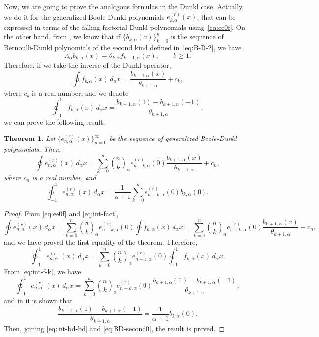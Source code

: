 \documentclass[11pt]{article}
\theoremstyle{plain}
\newtheorem{theorem}{Theorem}[section]
\theoremstyle{remark}
\numberwithin{equation}{section} %
\newcommand{\La}{\Lambda_{\alpha}}
\newcommand{\binoma}[2]{\binom{#1}{#2}_{\!\alpha}}
\begin{document}
Now, we are going to prove the analogous formulas in the Dunkl case. Actually, we do it for the generalized Boole-Dunkl polynomials $e_{k,\alpha}^{(r)}(x)$, that can be expressed in terms of the falling factorial Dunkl polynomials using~\eqref{eq:ee0f}.
On the other hand, from \cite[Theorem~6.2]{ELMV}, we know that if $\{b_{k,\alpha}(x)\}_{k=0}^n$ is the sequence of Bernoulli-Dunkl polynomials of the second kind defined in~\eqref{eq:B-D-2}, we have
\[
  \La b_{k,\alpha}(x) = \theta_{k,\alpha}f_{k-1,\alpha}(x), \qquad k \ge 1.
\]
Therefore, if we take the inverse of the Dunkl operator, 
\begin{equation}
\label{eq:int-fact}
  \oint f_{k,\alpha}(x)\,d_\alpha x = \frac{b_{k+1,\alpha}(x)}{\theta_{k+1,\alpha}} + c_k,
\end{equation}
where $c_k$ is a real number, and we denote
\begin{equation}
\label{eq:int-f-k}
  \oint_{-1}^1 f_{k,\alpha}(x)\,d_\alpha x 
  = \frac{b_{k+1,\alpha}(1)-b_{k+1,\alpha}(-1)}{\theta_{k+1,\alpha}},
\end{equation}
we can prove the following result:

\begin{theorem}
Let $\{e_{n,\alpha}^{(r)}(x)\}_{n=0}^{\infty}$ be the sequence of generalized Boole-Dunkl polynomials. Then,
\[
  \oint e_{n,\alpha}^{(r)}(x)\,d_{\alpha}x
  = \sum_{k=0}^n \binoma{n}{k} e_{n-k,\alpha}^{(r)}(0) \frac{b_{k+1,\alpha}(x)}{\theta_{k+1,\alpha}} + c_n,
\]
where $c_n$ is a real number, and
\[
  \oint_{-1}^1 e_{n,\alpha}^{(r)}(x)\,d_{\alpha}x
  = \frac{1}{\alpha+1} \sum_{k=0}^n e_{n-k,\alpha}^{(r)}(0)b_{k,\alpha}(0).
\]
\end{theorem}

\begin{proof}
From \eqref{eq:ee0f} and \eqref{eq:int-fact},
\[
  \oint e_{n,\alpha}^{(r)}(x)\,d_{\alpha}x
  = \sum_{k=0}^n \binoma{n}{k} e_{n-k,\alpha}^{(r)}(0)
  \oint f_{k,\alpha}(x)\,d_{\alpha}x
  = \sum_{k=0}^n \binoma{n}{k} e_{n-k,\alpha}^{(r)}(0) \frac{b_{k+1,\alpha}(x)}{\theta_{k+1,\alpha}} + c_n,
\]
and we have proved the first equality of the theorem. Therefore,
\[
  \oint_{-1}^1 e_{n,\alpha}^{(r)}(x)\,d_{\alpha}x
  = \sum_{k=0}^n \binoma{n}{k}e_{n-k,\alpha}^{(r)}(0) \oint_{-1}^1 f_{k,\alpha}(x)\,d_{\alpha}x.
\]
From \eqref{eq:int-f-k}, we have
\begin{equation}
\label{eq:int-bd-bd}
  \oint_{-1}^1 e_{n,\alpha}^{(r)}(x)\,d_{\alpha}x
  = \sum_{k=0}^n \binoma{n}{k} e_{n-k,\alpha}^{(r)}(0) 
  \frac{b_{k+1,\alpha}(1)-b_{k+1,\alpha}(-1)}{\theta_{k+1,\alpha}},
\end{equation}
and in \cite[Theorem~6.3]{ELMV} it is shown that
\begin{equation}
\label{eq:BD-second0}
  \frac{b_{k+1,\alpha}(1)-b_{k+1,\alpha}(-1)}{\theta_{k+1,\alpha}}
  = \frac{1}{\alpha+1}b_{k,\alpha}(0).
\end{equation}
Then, joining \eqref{eq:int-bd-bd} and \eqref{eq:BD-second0}, the result is proved.
\end{proof}
\end{document}
